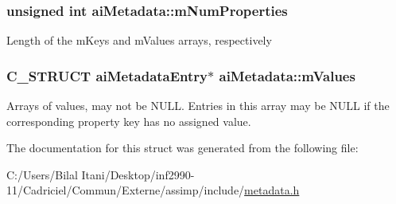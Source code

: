 \subsubsection[{\texorpdfstring{m\+Num\+Properties}{mNumProperties}}]{\setlength{\rightskip}{0pt plus 5cm}unsigned int ai\+Metadata\+::m\+Num\+Properties}\hypertarget{structai_metadata_a32c4587c53dd402a5878ffc94088e528}{}\label{structai_metadata_a32c4587c53dd402a5878ffc94088e528}
Length of the m\+Keys and m\+Values arrays, respectively 
\subsubsection[{\texorpdfstring{m\+Values}{mValues}}]{\setlength{\rightskip}{0pt plus 5cm}C\+\_\+\+S\+T\+R\+U\+CT {\bf ai\+Metadata\+Entry}$\ast$ ai\+Metadata\+::m\+Values}\hypertarget{structai_metadata_a34b515fcb5b806c471d3c6ce7bc76beb}{}\label{structai_metadata_a34b515fcb5b806c471d3c6ce7bc76beb}
Arrays of values, may not be N\+U\+LL. Entries in this array may be N\+U\+LL if the corresponding property key has no assigned value. 

The documentation for this struct was generated from the following file\+:\begin{DoxyCompactItemize}
\item 
C\+:/\+Users/\+Bilal Itani/\+Desktop/inf2990-\/11/\+Cadriciel/\+Commun/\+Externe/assimp/include/\hyperlink{metadata_8h}{metadata.\+h}\end{DoxyCompactItemize}
